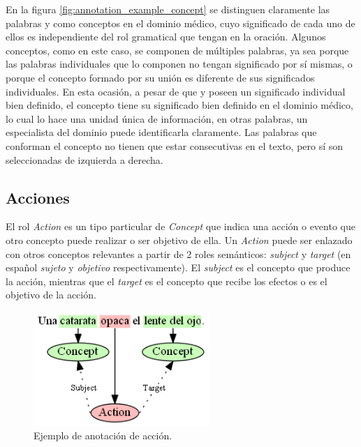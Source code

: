 En la figura \ref{fig:annotation_example_concept} se distinguen claramente las palabras  y  como conceptos en el dominio médico, cuyo significado de cada uno de ellos es independiente del rol gramatical que tengan en la oración. Algunos conceptos, como  en este caso, se componen de múltiples palabras, ya sea porque las palabras individuales que lo componen no tengan significado por sí mismas, o porque el concepto formado por su unión es diferente de sus significados individuales. En esta ocasión, a pesar de que  y  poseen un significado individual bien definido, el concepto  tiene su significado bien definido en el dominio médico, lo cual lo hace una unidad única de información, en otras palabras, un especialista del dominio puede identificarla claramente. Las palabras que conforman el concepto no tienen que estar consecutivas en el texto, pero sí son seleccionadas de izquierda a derecha.

\subsection{Acciones}
El rol \textit{Action} es un tipo particular de \textit{Concept} que indica una acción o evento que otro concepto puede realizar o ser objetivo de ella. Un \textit{Action} puede ser enlazado con otros conceptos relevantes a partir de 2 roles semánticos: \textit{subject} y \textit{target} (en español \textit{sujeto} y \textit{objetivo} respectivamente). El \textit{subject} es el concepto que produce la acción, mientras que el \textit{target} es el concepto que recibe los efectos o es el objetivo de la acción.

\begin{figure}[H]
	\begin{center}
		\includegraphics[height=1.7in]{graphics/annotation_example_action.png}
		\caption[Anotación de acción]{Ejemplo de anotación de acción.}
		\label{fig:annotation_example_action}
	\end{center}
\end{figure}

